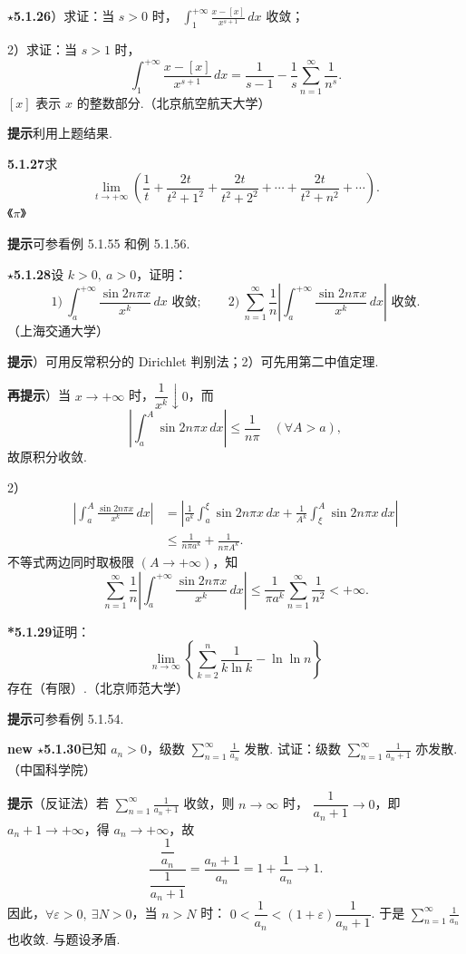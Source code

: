 \documentclass[UTF8, 12pt, fontset=fandol, oneside]{ctexart}
\begin{document}
\noindent\textbf{$\star$5.1.26}）求证：当 $s>0$ 时，
$\displaystyle\int_1^{+\infty}\frac{x-[x]}{x^{s+1}}\,dx$ 收敛；

2）求证：当 $s>1$ 时，
\[
  \int_1^{+\infty}\frac{x-[x]}{x^{s+1}}\,dx
  =\frac1{s-1}-\frac1s\sum_{n=1}^{\infty}\frac1{n^s}.
\]
$[x]$ 表示 $x$ 的整数部分.（北京航空航天大学）

\noindent\textbf{提示}\quad 利用上题结果.

\noindent\textbf{5.1.27}\quad 求
\[
  \lim_{t\to+\infty}\left(\frac1t+\frac{2t}{t^2+1^2}+\frac{2t}{t^2+2^2}+\cdots+\frac{2t}{t^2+n^2}+\cdots\right).
\]
《$\pi$》

\noindent\textbf{提示}\quad 可参看例 5.1.55 和例 5.1.56.

\noindent\textbf{$\star$5.1.28}\quad 设 $k>0,\ a>0$，证明：
\[
  1)\ \int_a^{+\infty}\frac{\sin 2n\pi x}{x^k}\,dx\text{ 收敛};\qquad
  2)\ \sum_{n=1}^{\infty}\frac1n\left|\int_a^{+\infty}\frac{\sin 2n\pi x}{x^k}\,dx\right|\text{ 收敛}.
\]
（上海交通大学）

\noindent\textbf{提示}）可用反常积分的 Dirichlet 判别法；2）可先用第二中值定理.

\noindent\textbf{再提示}）当 $x\to+\infty$ 时，$\dfrac1{x^k}\downarrow0$，而
\[
  \left|\int_a^A\sin2n\pi x\,dx\right|\le\frac1{n\pi}\quad(\forall A>a),
\]
故原积分收敛.

2）
\[
\begin{aligned}
\left|\int_a^A\frac{\sin2n\pi x}{x^k}\,dx\right|
&=\left|\frac1{a^k}\int_a^\xi\sin2n\pi x\,dx+
\frac1{A^k}\int_\xi^A\sin2n\pi x\,dx\right|\\
&\le \frac1{n\pi a^k}+\frac1{n\pi A^k}.
\end{aligned}
\]
不等式两边同时取极限 $(A\to+\infty)$，知
\[
  \sum_{n=1}^{\infty}\frac1n\left|\int_a^{+\infty}\frac{\sin2n\pi x}{x^k}\,dx\right|
  \le \frac1{\pi a^k}\sum_{n=1}^{\infty}\frac1{n^2}<+\infty.
\]

\noindent\textbf{*5.1.29}\quad 证明：
\[
  \lim_{n\to\infty}\left\{\sum_{k=2}^n\frac1{k\ln k}-\ln\ln n\right\}
\]
存在（有限）.（北京师范大学）

\noindent\textbf{提示}\quad 可参看例 5.1.54.

\noindent\textbf{new $\star$5.1.30}\quad 已知 $a_n>0$，级数
$\displaystyle\sum_{n=1}^{\infty}\frac1{a_n}$ 发散. 试证：级数
$\displaystyle\sum_{n=1}^{\infty}\frac1{a_n+1}$ 亦发散.（中国科学院）

\noindent\textbf{提示}\quad （反证法）若 $\displaystyle\sum_{n=1}^{\infty}\frac1{a_n+1}$ 收敛，则 $n\to\infty$ 时，
$\dfrac1{a_n+1}\to0$，即 $a_n+1\to+\infty$，得 $a_n\to+\infty$，故
\[
  \frac{\dfrac1{a_n}}{\dfrac1{a_n+1}}=\frac{a_n+1}{a_n}=1+\frac1{a_n}\to1.
\]
因此，$\forall\varepsilon>0,\ \exists N>0$，当 $n>N$ 时：
$0<\dfrac1{a_n}<(1+\varepsilon)\dfrac1{a_n+1}$. 于是
$\displaystyle\sum_{n=1}^{\infty}\frac1{a_n}$ 也收敛. 与题设矛盾.
\end{document}

